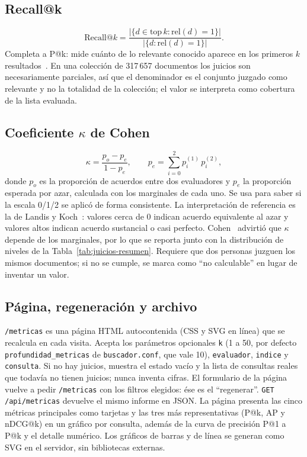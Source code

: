 \documentclass[11pt,spanish]{article}
\begin{document}
\subsection{Recall@k}
\begin{equation}
  \mathrm{Recall}@k =
  \frac{\bigl|\{d \in \mathrm{top}\,k : \mathrm{rel}(d)=1\}\bigr|}
       {\bigl|\{d : \mathrm{rel}(d)=1\}\bigr|}.
\end{equation}
Completa a P@k: mide cuánto de lo relevante conocido aparece en los primeros
$k$ resultados~\cite{manning2008}. En una colección de 317\,657 documentos los
juicios son necesariamente parciales, así que el denominador es el conjunto
juzgado como relevante y no la totalidad de la colección; el valor se interpreta
como cobertura de la lista evaluada.

\subsection{Coeficiente $\kappa$ de Cohen}
\begin{equation}
  \kappa = \frac{p_o - p_e}{1 - p_e},
  \qquad
  p_e = \sum_{i=0}^{2} p_i^{(1)}\,p_i^{(2)},
\end{equation}
donde $p_o$ es la proporción de acuerdos entre dos evaluadores y $p_e$ la
proporción esperada por azar, calculada con los marginales de cada uno. Se
usa para saber si la escala 0/1/2 se aplicó de forma consistente. La
interpretación de referencia es la de Landis y Koch~\cite{landis1977}: valores
cerca de 0 indican acuerdo equivalente al azar y valores altos indican acuerdo
sustancial o casi perfecto. Cohen~\cite{cohen1960} advirtió que $\kappa$ depende
de los marginales, por lo que se reporta junto con la distribución de niveles
de la Tabla~\ref{tab:juicios-resumen}. Requiere que dos personas juzguen los
mismos documentos; si no se cumple, se marca como ``no calculable'' en lugar de
inventar un valor.

\subsection{Página, regeneración y archivo}
\label{sec:pagina-metricas}

\texttt{/metricas} es una página HTML autocontenida (CSS y SVG en línea) que se
recalcula en cada visita. Acepta los parámetros opcionales \texttt{k} (1 a 50,
por defecto \texttt{profundidad\_metricas} de \texttt{buscador.conf}, que vale
10), \texttt{evaluador}, \texttt{indice} y \texttt{consulta}. Si no hay
juicios, muestra el estado vacío y la lista de consultas reales que todavía no
tienen juicios; nunca inventa cifras. El formulario de la página vuelve a pedir
\texttt{/metricas} con los filtros elegidos: ése es el ``regenerar''.
\texttt{GET /api/metricas} devuelve el mismo informe en JSON. La página presenta
las cinco métricas principales como tarjetas y las tres más representativas
(P@k, AP y nDCG@k) en un gráfico por consulta, además de la curva de precisión
P@1 a P@k y el detalle numérico. Los gráficos de barras y de línea se generan
como SVG en el servidor, sin bibliotecas externas.
\end{document}
